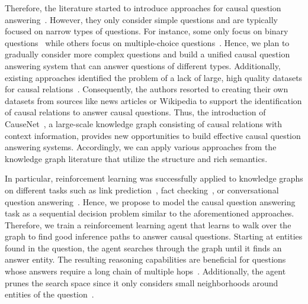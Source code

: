 Therefore, the literature started to introduce approaches for causal question answering~\cite{SharpCausalQAEmbeddings2016, HassanzadeshCausalQA2019, KayeshCausalTransfer2020, DalalCausalQAISWC2021}. However, they only consider simple questions and are typically focused on narrow types of questions. For instance, some only focus on binary questions~\cite{HassanzadeshCausalQA2019, KayeshCausalTransfer2020} while others focus on multiple-choice questions~\cite{SharpCausalQAEmbeddings2016, DalalCausalQAISWC2021}.
Hence, we plan to gradually consider more complex questions and build a unified causal question answering system that can answer questions of different types.
Additionally, existing approaches identified the problem of a lack of large, high quality datasets for causal relations~\cite{SharpCausalQAEmbeddings2016, HassanzadeshCausalQA2019, KayeshCausalTransfer2020}. Consequently, the authors resorted to creating their own datasets from sources like news articles or Wikipedia to support the identification of causal relations to answer causal questions. Thus, the introduction of CauseNet~\cite{Heindorf2020Causenet}, a large-scale knowledge graph consisting of causal relations with context information, provides new opportunities to build effective causal question answering systems. Accordingly, we can apply various approaches from the knowledge graph literature that utilize the structure and rich semantics.

In particular, reinforcement learning was successfully applied to knowledge graphs on different tasks such as link prediction~\cite{Xiong2017DeePpath}, fact checking~\cite{Das2018Minerva}, or conversational question answering~\cite{Kaiser2021Reinforcement}. Hence, we propose to model the causal question answering task as a sequential decision problem similar to the aforementioned approaches.
Therefore, we train a reinforcement learning agent that learns to walk over the graph to find good inference paths to answer causal questions. Starting at entities found in the question, the agent searches through the graph until it finds an answer entity. The resulting reasoning capabilities are beneficial for questions whose answers require a long chain of multiple hops~\cite{Xiong2017DeePpath, Das2018Minerva, Wan2021GaussianPath}. Additionally, the agent prunes the search space since it only considers small neighborhoods around entities of the question~\cite{Das2018Minerva, Qiu2020Stepwise}. 

